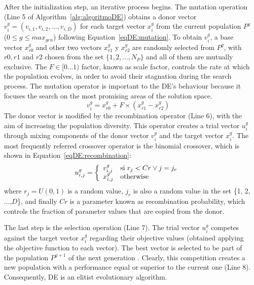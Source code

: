 After the initialization step, an iterative process begins. The mutation operation (Line 5 of Algorithm~\ref{alg:algoritmoDE}) obtains a donor vector $v_i^g = (v_{i,1}, v_{i,2}, . . . , v_{i,D})$ for each target vector $x_i^g$ from the current population $P^g$ ($0 \leq g \leq max_{gen}$) following Equation~\ref{eqDE:mutation}. To obtain $v_i^g$, a base vector $x_{r0}^g$ and other two vectors $x_{r1}^g$ y $x_{r2}^g$ are randomly selected from $P^g$, with $r0, r1$ and $r2$ chosen from the set $\{1,2,...,N_P\}$ and all of them are mutually exclusive. The $F \in [0 . . . 1)$ factor, known as scale factor, controls the rate at which the population evolves, in order to avoid their stagnation during the search process. The mutation operator is important to the DE's behaviour because it focuses the search on the most promising areas of the solution space. 
\vspace{-0.1cm}
\begin{equation}\label{eqDE:mutation} 
v_i^g = x_{r0}^g + F \times (x_{r1}^g - x_{r2}^g)
\end{equation}
The donor vector is modified by the recombination operator (Line 6), with the aim of increasing the population diversity. This operator creates a trial vector $u_i^g$ through mixing components of the donor vector $v_i^g$ and the target vector $x_i^g$. The most frequently referred crossover operator is the binomial crossover, which is shown in Equation~\ref{eqDE:recombination}:
\vspace{-0.4cm}
\begin{equation} \label{eqDE:recombination}
u_{i,j}^g = \left\lbrace
\begin{array}{ll}
v_{i,j}^g & \textup{si } r_j < Cr \vee j = j_r\\
x_{i,j}^g & \textup{otherwise} 
\end{array}
\right.
\end{equation}
\noindent where $r_j=U(0, 1)$ is a random value, $j_r$ is also a random value in the set \{1, 2, ...,$D$\}, and finally $Cr$ is a parameter known as recombination probability, which controls the fraction of parameter values that are copied from the donor.

The last step %
is the selection operation (Line 7). The trial vector $u_{i}^g$ competes against the target vector $x_{i}^g$ regarding their objective values (obtained applying the objective function to each vector). The best vector is selected to be part of the population $P^{g+1}$ of the next generation%
. Clearly, this competition %
creates a new population with a performance equal or superior to the current one (Line 8). Consequently, DE is an elitist evolutionary algorithm. 

